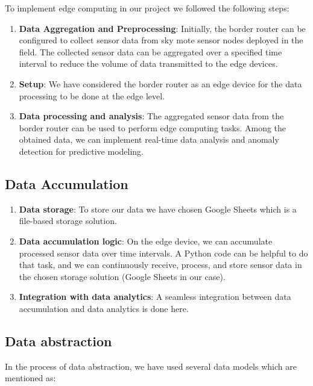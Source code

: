 \documentclass{article}
\begin{document}
To implement edge computing in our project we followed the following steps:

\begin{enumerate}
    \item \textbf{Data Aggregation and Preprocessing}: Initially, the border router can be configured to collect sensor data from sky mote sensor nodes deployed in the field. The collected sensor data can be aggregated over a specified time interval to reduce the volume of data transmitted to the edge devices.
    
    \item \textbf{Setup}: We have considered the border router as an edge device for the data processing to be done at the edge level.
    
    \item \textbf{Data processing and analysis}: The aggregated sensor data from the border router can be used to perform edge computing tasks. Among the obtained data, we can implement real-time data analysis and anomaly detection for predictive modeling.
\end{enumerate}

\subsection{Data Accumulation}

\begin{enumerate}
    \item \textbf{Data storage}: To store our data we have chosen Google Sheets which is a file-based storage solution.
    
    \item \textbf{Data accumulation logic}: On the edge device, we can accumulate processed sensor data over time intervals. A Python code can be helpful to do that task, and we can continuously receive, process, and store sensor data in the chosen storage solution (Google Sheets in our case).
    
    \item \textbf{Integration with data analytics}: A seamless integration between data accumulation and data analytics is done here.
\end{enumerate}

\subsection{Data abstraction}

In the process of data abstraction, we have used several data models which are mentioned as:
\end{document}
